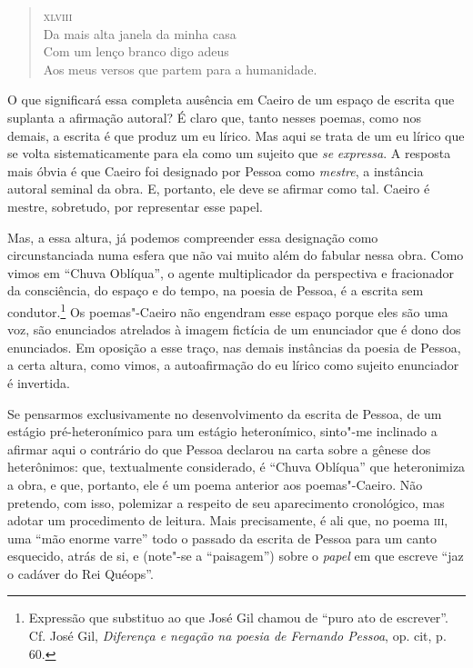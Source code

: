 \begin{verse}
\textsc{xlviii}\\[5pt]
Da mais alta janela da minha casa\\
Com um lenço branco digo adeus\\
Aos meus versos que partem para a \qb{}humanidade.
\end{verse}

O que significará essa completa ausência em Caeiro de um espaço de
escrita que suplanta a afirmação autoral? É claro que, tanto nesses
poemas, como nos demais, a escrita é que produz um eu lírico. Mas aqui
se trata de um eu lírico que se volta sistematicamente para ela como um
sujeito que \emph{se} \emph{expressa}. A resposta mais óbvia é que
Caeiro foi designado por Pessoa como \emph{mestre}, a instância autoral
seminal da obra. E, portanto, ele deve se afirmar como tal. Caeiro é
mestre, sobretudo, por representar esse papel.

Mas, a essa altura, já podemos compreender essa designação como
circunstanciada numa esfera que não vai muito além do fabular nessa
obra. Como vimos em ``Chuva Oblíqua'', o agente multiplicador da
perspectiva e fracionador da consciência, do espaço e do tempo, na
poesia de Pessoa, é a escrita sem condutor.\footnote{Expressão que
  substituo ao que José Gil chamou de ``puro ato de escrever''. Cf. José
  Gil, \emph{Diferença e negação na poesia de Fernando Pessoa}, op. cit,
  p. 60.} Os poemas"-Caeiro não engendram esse espaço porque eles são uma
voz, são enunciados atrelados à imagem fictícia de um enunciador que é
dono dos enunciados. Em oposição a esse traço, nas demais instâncias da
poesia de Pessoa, a certa altura, como vimos, a autoafirmação do eu
lírico como sujeito enunciador é invertida.

Se pensarmos exclusivamente no desenvolvimento da escrita de Pessoa, de
um estágio pré-heteronímico para um estágio heteronímico, sinto"-me
inclinado a afirmar aqui o contrário do que Pessoa declarou na carta
sobre a gênese dos heterônimos: que, textualmente considerado, é ``Chuva
Oblíqua'' que heteronimiza a obra, e que, portanto, ele é um poema
anterior aos poemas"-Caeiro. Não pretendo, com isso, polemizar a respeito
de seu aparecimento cronológico, mas adotar um procedimento de leitura.
Mais precisamente, é ali que, no poema \textsc{iii}, uma ``mão enorme
varre'' todo o passado da escrita de Pessoa para um canto esquecido,
atrás de si, e (note"-se a ``paisagem'') sobre o \emph{papel} em que
escreve ``jaz o cadáver do Rei Quéops''.

